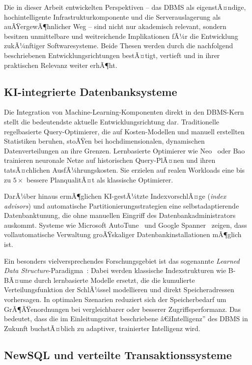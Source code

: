 ﻿\documentclass[a4paper,12pt]{article}
\theoremstyle{definition}
\begin{document}
Die in dieser Arbeit entwickelten Perspektiven -- das DBMS als eigenstÃ¤ndige, hochintelligente Infrastrukturkomponente und die Serverauslagerung als auÃŸergewÃ¶hnlicher Weg -- sind nicht nur akademisch relevant, sondern besitzen unmittelbare und weitreichende Implikationen fÃ¼r die Entwicklung zukÃ¼nftiger Softwaresysteme. Beide Thesen werden durch die nachfolgend beschriebenen Entwicklungsrichtungen bestÃ¤tigt, vertieft und in ihrer praktischen Relevanz weiter erhÃ¶ht.

\subsection{KI-integrierte Datenbanksysteme}

Die Integration von Machine-Learning-Komponenten direkt in den DBMS-Kern stellt die bedeutendste aktuelle Entwicklungsrichtung dar. Traditionelle regelbasierte Query-Optimierer, die auf Kosten-Modellen und manuell erstellten Statistiken beruhen, stoÃŸen bei hochdimensionalen, dynamischen Datenverteilungen an ihre Grenzen. Lernbasierte Optimierer wie Neo~\cite{marcus2019neo} oder Bao~\cite{marcus2021bao} trainieren neuronale Netze auf historischen Query-PlÃ¤nen und ihren tatsÃ¤chlichen AusfÃ¼hrungskosten. Sie erzielen auf realen Workloads eine bis zu $5\times$ bessere PlanqualitÃ¤t als klassische Optimierer.

DarÃ¼ber hinaus ermÃ¶glichen KI-gestÃ¼tzte IndexvorschlÃ¤ge (\emph{index advisors}) und automatische Partitionierungsstrategien eine selbstadaptierende Datenbanktunung, die ohne manuellen Eingriff des Datenbankadministrators auskommt. Systeme wie Microsoft AutoTune~\cite{chaudhuri1997autoadmin} und Google Spanner~\cite{corbett2013spanner} zeigen, dass vollautomatische Verwaltung groÃŸskaliger Datenbankinstallationen mÃ¶glich ist.

Ein besonders vielversprechendes Forschungsgebiet ist das sogenannte \emph{Learned Data Structure}-Paradigma~\cite{kraska2018learned}: Dabei werden klassische Indexstrukturen wie B-BÃ¤ume durch lernbasierte Modelle ersetzt, die die kumulierte Verteilungsfunktion der SchlÃ¼ssel modellieren und direkt Speicheradressen vorhersagen. In optimalen Szenarien reduziert sich der Speicherbedarf um GrÃ¶ÃŸenordnungen bei vergleichbarer oder besserer Zugriffsperformanz. Das bedeutet, dass die im Einleitungszitat beschriebene â€žIntelligenz'' des DBMS in Zukunft buchstÃ¤blich zu adaptiver, trainierter Intelligenz wird.

\subsection{NewSQL und verteilte Transaktionssysteme}
\end{document}
